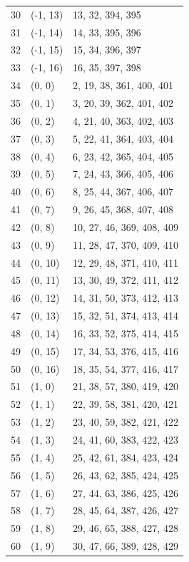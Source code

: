 \documentclass{article}
\begin{document}
\begin{longtable}{lll}
  30 & (-1, 13) & 13, 32, 394, 395 \\
  31 & (-1, 14) & 14, 33, 395, 396 \\
  32 & (-1, 15) & 15, 34, 396, 397 \\
  33 & (-1, 16) & 16, 35, 397, 398 \\
  34 & (0, 0) & 2, 19, 38, 361, 400, 401 \\
  35 & (0, 1) & 3, 20, 39, 362, 401, 402 \\
  36 & (0, 2) & 4, 21, 40, 363, 402, 403 \\
  37 & (0, 3) & 5, 22, 41, 364, 403, 404 \\
  38 & (0, 4) & 6, 23, 42, 365, 404, 405 \\
  39 & (0, 5) & 7, 24, 43, 366, 405, 406 \\
  40 & (0, 6) & 8, 25, 44, 367, 406, 407 \\
  41 & (0, 7) & 9, 26, 45, 368, 407, 408 \\
  42 & (0, 8) & 10, 27, 46, 369, 408, 409 \\
  43 & (0, 9) & 11, 28, 47, 370, 409, 410 \\
  44 & (0, 10) & 12, 29, 48, 371, 410, 411 \\
  45 & (0, 11) & 13, 30, 49, 372, 411, 412 \\
  46 & (0, 12) & 14, 31, 50, 373, 412, 413 \\
  47 & (0, 13) & 15, 32, 51, 374, 413, 414 \\
  48 & (0, 14) & 16, 33, 52, 375, 414, 415 \\
  49 & (0, 15) & 17, 34, 53, 376, 415, 416 \\
  50 & (0, 16) & 18, 35, 54, 377, 416, 417 \\
  51 & (1, 0) & 21, 38, 57, 380, 419, 420 \\
  52 & (1, 1) & 22, 39, 58, 381, 420, 421 \\
  53 & (1, 2) & 23, 40, 59, 382, 421, 422 \\
  54 & (1, 3) & 24, 41, 60, 383, 422, 423 \\
  55 & (1, 4) & 25, 42, 61, 384, 423, 424 \\
  56 & (1, 5) & 26, 43, 62, 385, 424, 425 \\
  57 & (1, 6) & 27, 44, 63, 386, 425, 426 \\
  58 & (1, 7) & 28, 45, 64, 387, 426, 427 \\
  59 & (1, 8) & 29, 46, 65, 388, 427, 428 \\
  60 & (1, 9) & 30, 47, 66, 389, 428, 429 \\

\end{longtable}
\end{document}
